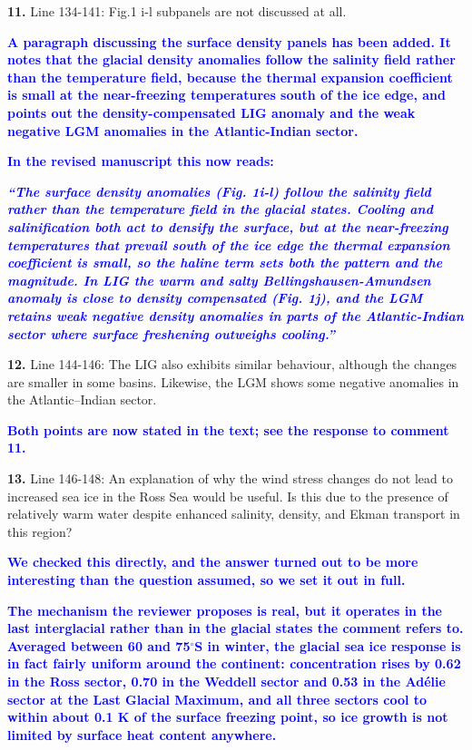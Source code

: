 \documentclass[pdflatex,sn-nature]{sn-jnl}
\begin{document}
\medskip
\noindent \textbf{11.} Line 134-141: Fig.1 i-l subpanels are not discussed at all.
\medskip

\noindent\textcolor{blue}{\textbf{A paragraph discussing the surface density panels has been added. It notes that the glacial density anomalies follow the salinity field rather than the temperature field, because the thermal expansion coefficient is small at the near-freezing temperatures south of the ice edge, and points out the density-compensated LIG anomaly and the weak negative LGM anomalies in the Atlantic-Indian sector.}}



\noindent\textcolor{blue}{\textbf{In the revised manuscript this now reads:}}


\medskip
\noindent\textcolor{blue}{\textbf{\textit{``The surface density anomalies (Fig. 1i-l) follow the salinity field rather than the temperature field in the glacial states. Cooling and salinification both act to densify the surface, but at the near-freezing temperatures that prevail south of the ice edge the thermal expansion coefficient is small, so the haline term sets both the pattern and the magnitude. In LIG the warm and salty Bellingshausen-Amundsen anomaly is close to density compensated (Fig. 1j), and the LGM retains weak negative density anomalies in parts of the Atlantic-Indian sector where surface freshening outweighs cooling.''}}}
\medskip

\medskip
\noindent \textbf{12.} Line 144-146: The LIG also exhibits similar behaviour, although the changes are smaller in some basins. Likewise, the LGM shows some negative anomalies in the Atlantic--Indian sector.
\medskip

\noindent\textcolor{blue}{\textbf{Both points are now stated in the text; see the response to comment 11.}}


\medskip
\noindent \textbf{13.} Line 146-148: An explanation of why the wind stress changes do not lead to increased sea ice in the Ross Sea would be useful. Is this due to the presence of relatively warm water despite enhanced salinity, density, and Ekman transport in this region?
\medskip

\noindent\textcolor{blue}{\textbf{We checked this directly, and the answer turned out to be more interesting than the question assumed, so we set it out in full.}}


\noindent\textcolor{blue}{\textbf{The mechanism the reviewer proposes is real, but it operates in the last interglacial rather than in the glacial states the comment refers to. Averaged between 60 and 75$^\circ$S in winter, the glacial sea ice response is in fact fairly uniform around the continent: concentration rises by 0.62 in the Ross sector, 0.70 in the Weddell sector and 0.53 in the Ad\'elie sector at the Last Glacial Maximum, and all three sectors cool to within about 0.1 K of the surface freezing point, so ice growth is not limited by surface heat content anywhere.}}
\end{document}
